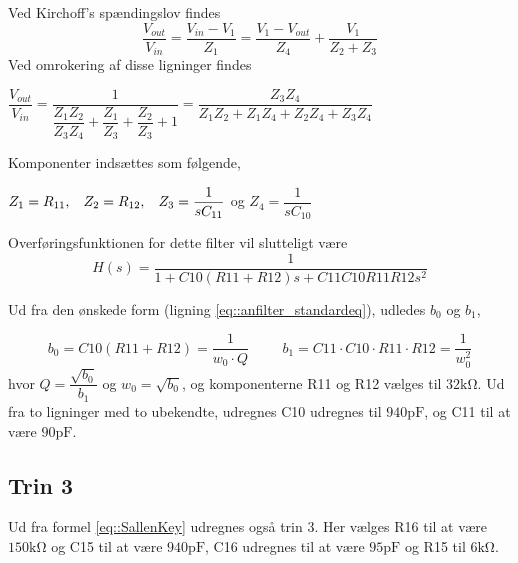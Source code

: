Ved Kirchoff's spændingslov findes\\
\begin{equation}
	\dfrac{V_{out}}{V_{in}} = \dfrac{V_{in}-V_1}{Z_1} = \dfrac{V_1 - V_{out}}{Z_4}+\dfrac{V_1}{Z_2+Z_3}
\end{equation}
Ved omrokering af disse ligninger findes

\begin{center}
	$\dfrac{V_{out}}{V_{in}} = \dfrac{1}{\dfrac{Z_1Z_2}{Z_3Z_4}+\dfrac{Z_1}{Z_3}+\dfrac{Z_2}{Z_3}+1} = \dfrac{Z_3Z_4}{Z_1Z_2+Z_1Z_4+Z_2Z_4+Z_3Z_4}$
\end{center}

Komponenter indsættes som følgende,
\begin{center}
	$Z_1 = R_{11}, \hspace{3mm} Z_2 = R_{12}, \hspace{3mm} Z_3 = \dfrac{1}{sC_{11}}$ \hspace{0.5mm} og \hspace{0.5mm} $Z_4 = \dfrac{1}{sC_{10}}$
\end{center}

Overføringsfunktionen for dette filter vil slutteligt være\\


\begin{equation}
H(s) = \dfrac{1}{1+C10(R11+R12) s+C11C10R11R12 s^2}
\label{eq::SallenKey}
\end{equation}
 
Ud fra den ønskede form (ligning \ref{eq::anfilter_standardeq}), udledes $b_0$ og $b_1$,

\begin{equation}
	 b_0 = C10(R11+R12) = \dfrac{1}{w_0\cdot Q} \hspace{1cm} b_1 = C11 \cdot C10 \cdot R11 \cdot R12 = \dfrac{1}{w_0^2} \nonumber
\end{equation}
hvor $Q = \dfrac{\sqrt{b_0}}{b_1}$ og $w_0 = \sqrt{b_0}$, og komponenterne R11 og R12 vælges til $32\si{\kilo\ohm}$. Ud fra to ligninger med to ubekendte, udregnes C10 udregnes til $940\si{\pico\farad}$, og C11 til at være $90 \si{\pico\farad}$.
\subsection{Trin 3}
Ud fra formel \ref{eq::SallenKey} udregnes også trin 3. Her vælges R16 til at være $150\si{\kilo\ohm}$ og C15 til at være $940\si{\pico\farad}$, C16 udregnes til at være $95\si{\pico\farad}$ og R15 til $6 \si{\kilo\ohm} $. 

